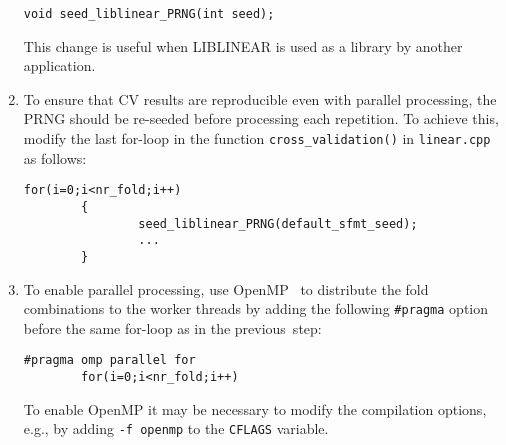 \begin{enumerate}
\begin{Verbatim}[fontsize=\small]
void seed_liblinear_PRNG(int seed);
\end{Verbatim}
  This change is useful when LIBLINEAR is used as a library by another
  application.
\item To ensure that CV results are reproducible even with parallel processing,
  the PRNG should be re-seeded before processing each repetition.
  To achieve this, modify the last for-loop in the
  function \verb|cross_validation()| in \verb|linear.cpp| as follows:
\begin{Verbatim}[fontsize=\small]
        for(i=0;i<nr_fold;i++)
        {
                seed_liblinear_PRNG(default_sfmt_seed);
                ...
        }
\end{Verbatim}
\item To enable parallel processing, use OpenMP~ to distribute
  the fold combinations to the worker threads by adding the following \verb|#pragma|
  option before the same for-loop as in the previous~step:
\begin{Verbatim}[fontsize=\small]
        #pragma omp parallel for
        for(i=0;i<nr_fold;i++)
\end{Verbatim}
To enable OpenMP it may be necessary to modify the compilation
options, e.g., by adding \verb|-f openmp| to the \verb|CFLAGS| variable.
\end{enumerate}


\clearpage
